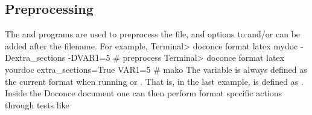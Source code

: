 \documentclass[%
oneside,                 %
final,                   %
10pt]{article}
\begin{document}
\subsection{Preprocessing}

The  and  programs are used to preprocess the
file, and options to  and/or  can be added after the
filename. For example,
\bsys
Terminal> doconce format latex mydoc -Dextra_sections -DVAR1=5     # preprocess
Terminal> doconce format latex yourdoc extra_sections=True VAR1=5  # mako
\esys
The variable  is always defined as the current format when
running  or . That is, in the last example,  is
defined as . Inside the Doconce document one can then perform
format specific actions through tests like 
\end{document}
